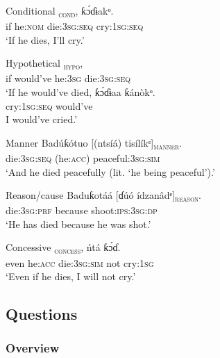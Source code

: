 Conditional
\ea\label{ex:syn:39}
\textsc{\textsubscript{cond}},   ƙ\'{ɔ}ɗɨakᵒ. \\
if   he:\textsc{nom}   die:\textsc{3sg:seq}     cry:\textsc{1sg:seq}    \\
\glt ‘If he dies, I’ll cry.’ 
\z



Hypothetical
\ea\label{ex:syn:40}
  \ea
  \textsc{\textsubscript{hypo}},  \\
  if   would’ve   he:\textsc{3sg}  die:\textsc{3sg:seq}    \\ 
  \glt ‘If he would’ve died,
  \ex
  \gll ƙ\'{ɔ}ɗɨaa   ƙánòkᵒ. \\
  cry:\textsc{1sg:seq}  would’ve    \\
  \glt  I would’ve cried.’ 
  \z
\z



Manner
\ea\label{ex:syn:41}
\gll Badúƙótuo   [(ntsíá)   tisílíkᵉ]\textsc{\textsubscript{manner}}. \\
die:\textsc{3sg:seq}   (he:\textsc{acc})  peaceful:3\textsc{sg:sim}    \\
\glt ‘And he died peacefully (lit. ‘he being peaceful’).’ 
\z



Reason/cause
\ea\label{ex:syn:42}
\gll Baduƙotáá   [ɗúó     ídzanâdᵉ]\textsc{\textsubscript{reason}}. \\
die:\textsc{3sg:prf}   because   shoot:\textsc{ips:3sg:dp}    \\
\glt ‘He has died because he was shot.’ 
\z



Concessive
\ea\label{ex:syn:43}
\textsc{\textsubscript{concess}},   ńtá   ƙ\'{ɔ}ɗ{\Í}. \\
even   he:\textsc{acc}   die:\textsc{3sg:sim}    not   cry:\textsc{1sg}    \\
\glt ‘Even if he dies, I will not cry.’ 
\z






\subsection{Questions}\label{sec:10.4}
\subsubsection{Overview}\label{sec:10.4.1}

